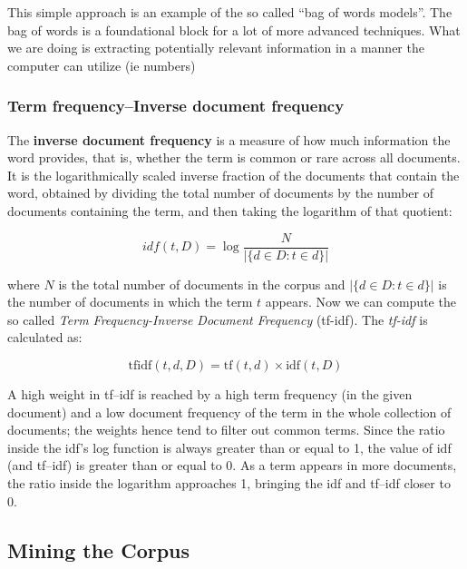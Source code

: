 \documentclass[11pt]{article}
\begin{document}
This simple approach is an example of the so called ``bag of words
models''. The bag of words is a foundational block for a lot of more
advanced techniques. What we are doing is extracting potentially
relevant information in a manner the computer can utilize (ie numbers)

    \hypertarget{term-frequencyinverse-document-frequency}{%
\subsubsection{Term frequency--Inverse document
frequency}\label{term-frequencyinverse-document-frequency}}

    The \textbf{inverse document frequency} is a measure of how much
information the word provides, that is, whether the term is common or
rare across all documents. It is the logarithmically scaled inverse
fraction of the documents that contain the word, obtained by dividing
the total number of documents by the number of documents containing the
term, and then taking the logarithm of that quotient:

\begin{equation}
idf(t, D) = \log \frac{N}{\vert\{d \in D : t \in d  \}\vert}
\end{equation}

    where \(N\) is the total number of documents in the corpus and
\(\vert\{d \in D : t \in d \}\vert\) is the number of documents in which
the term \(t\) appears. Now we can compute the so called \emph{Term
Frequency-Inverse Document Frequency} (tf-idf). The \emph{tf-idf} is
calculated as:

\begin{equation}
\text{tfidf}(t, d, D) = \text{tf}(t, d) \times \text{idf}(t,D)
\end{equation}

A high weight in tf--idf is reached by a high term frequency (in the
given document) and a low document frequency of the term in the whole
collection of documents; the weights hence tend to filter out common
terms. Since the ratio inside the idf's log function is always greater
than or equal to 1, the value of idf (and tf--idf) is greater than or
equal to 0. As a term appears in more documents, the ratio inside the
logarithm approaches 1, bringing the idf and tf--idf closer to 0.

    \hypertarget{mining-the-corpus}{%
\subsection{Mining the Corpus}\label{mining-the-corpus}}
\end{document}

